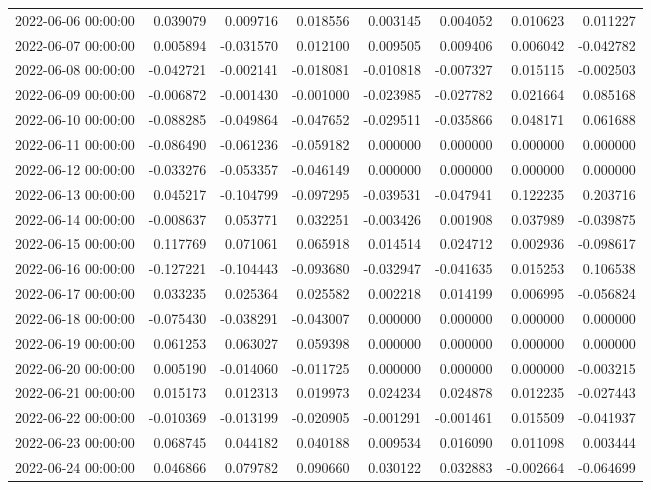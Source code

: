 \begin{tabular}{lrrrrrrr}
2022-06-06 00:00:00 & 0.039079 & 0.009716 & 0.018556 & 0.003145 & 0.004052 & 0.010623 & 0.011227 \\
2022-06-07 00:00:00 & 0.005894 & -0.031570 & 0.012100 & 0.009505 & 0.009406 & 0.006042 & -0.042782 \\
2022-06-08 00:00:00 & -0.042721 & -0.002141 & -0.018081 & -0.010818 & -0.007327 & 0.015115 & -0.002503 \\
2022-06-09 00:00:00 & -0.006872 & -0.001430 & -0.001000 & -0.023985 & -0.027782 & 0.021664 & 0.085168 \\
2022-06-10 00:00:00 & -0.088285 & -0.049864 & -0.047652 & -0.029511 & -0.035866 & 0.048171 & 0.061688 \\
2022-06-11 00:00:00 & -0.086490 & -0.061236 & -0.059182 & 0.000000 & 0.000000 & 0.000000 & 0.000000 \\
2022-06-12 00:00:00 & -0.033276 & -0.053357 & -0.046149 & 0.000000 & 0.000000 & 0.000000 & 0.000000 \\
2022-06-13 00:00:00 & 0.045217 & -0.104799 & -0.097295 & -0.039531 & -0.047941 & 0.122235 & 0.203716 \\
2022-06-14 00:00:00 & -0.008637 & 0.053771 & 0.032251 & -0.003426 & 0.001908 & 0.037989 & -0.039875 \\
2022-06-15 00:00:00 & 0.117769 & 0.071061 & 0.065918 & 0.014514 & 0.024712 & 0.002936 & -0.098617 \\
2022-06-16 00:00:00 & -0.127221 & -0.104443 & -0.093680 & -0.032947 & -0.041635 & 0.015253 & 0.106538 \\
2022-06-17 00:00:00 & 0.033235 & 0.025364 & 0.025582 & 0.002218 & 0.014199 & 0.006995 & -0.056824 \\
2022-06-18 00:00:00 & -0.075430 & -0.038291 & -0.043007 & 0.000000 & 0.000000 & 0.000000 & 0.000000 \\
2022-06-19 00:00:00 & 0.061253 & 0.063027 & 0.059398 & 0.000000 & 0.000000 & 0.000000 & 0.000000 \\
2022-06-20 00:00:00 & 0.005190 & -0.014060 & -0.011725 & 0.000000 & 0.000000 & 0.000000 & -0.003215 \\
2022-06-21 00:00:00 & 0.015173 & 0.012313 & 0.019973 & 0.024234 & 0.024878 & 0.012235 & -0.027443 \\
2022-06-22 00:00:00 & -0.010369 & -0.013199 & -0.020905 & -0.001291 & -0.001461 & 0.015509 & -0.041937 \\
2022-06-23 00:00:00 & 0.068745 & 0.044182 & 0.040188 & 0.009534 & 0.016090 & 0.011098 & 0.003444 \\
2022-06-24 00:00:00 & 0.046866 & 0.079782 & 0.090660 & 0.030122 & 0.032883 & -0.002664 & -0.064699 \\

\end{tabular}
